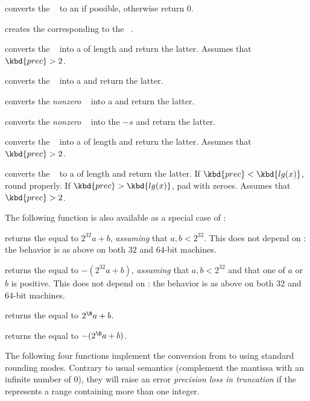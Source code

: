  converts the ~ to an
 if possible, otherwise return $0$.

 creates the  corresponding to the
~.

 converts the ~ into a
 of length  and return the latter. Assumes that
$\kbd{prec} > 2$.

 converts the ~ into a 
and return the latter.

 converts the \emph{nonzero} ~
into a  and return the latter.

 converts the \emph{nonzero} ~
into the  $-s$ and return the latter.

 converts the ~ into a
 of length  and return the latter. Assumes that
$\kbd{prec} > 2$.

 converts the ~ to a
 of length  and return the latter. If
$\kbd{prec} < \kbd{lg(x)}$, round properly. If $\kbd{prec} > \kbd{lg(x)}$,
pad with zeroes. Assumes that $\kbd{prec} > 2$.

\noindent The following function is also available as a special case of
:

 returns the  equal to $2^{32} a +
b$, \emph{assuming} that $a,b < 2^{32}$. This does not depend on
: the behavior is as above on both $32$ and $64$-bit
machines.

 returns the  equal to
$- (2^{32} a + b)$, \emph{assuming} that $a,b < 2^{32}$ and that one of $a$
or $b$ is positive. This does not depend on : the behavior
is as above on both $32$ and $64$-bit machines.

 returns the  equal to
$2^{\B} a + b$.

 returns the  equal to
$-(2^{\B} a + b)$.

The following four functions implement the conversion from  to
 using standard rounding modes. Contrary to usual semantics
(complement the mantissa with an infinite number of 0), they will raise an
error \emph{precision loss in truncation} if the  represents a
range containing more than one integer.

